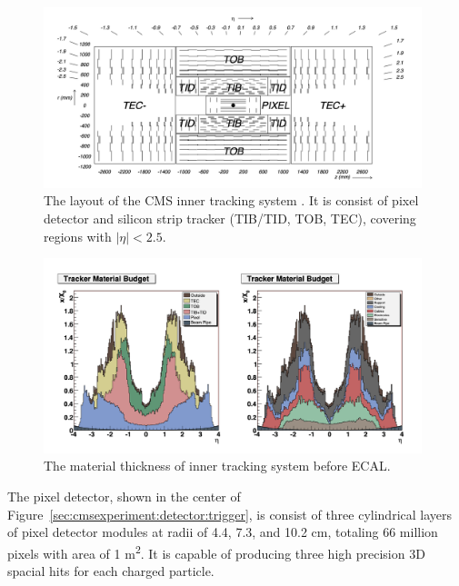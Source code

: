 \begin{figure}[ht]
    \centering
    \includegraphics[width=0.98\textwidth]{chapters/CMSExperiment/sectionDetector/figures/tracker.png}
    \caption{The layout of the CMS inner tracking system \cite{exhep:cms:Chatrchyan:2008aa}. It is consist of pixel detector and silicon strip tracker (TIB/TID, TOB, TEC), covering regions with $|\eta|<2.5$. }
    \label{sec:cmsexperiment:detector:tracker}
\end{figure}


\begin{figure}[ht]
    \centering
    \includegraphics[width=0.98\textwidth]{chapters/CMSExperiment/sectionDetector/figures/trackerMaterial.png}
    \caption{The material thickness of inner tracking system before ECAL.}
    \label{sec:cmsexperiment:detector:trackerMaterial}
\end{figure}


The pixel detector, shown in the center of Figure~\ref{sec:cmsexperiment:detector:trigger}, is consist of three cylindrical layers of pixel detector modules at radii of 4.4, 7.3, and 10.2 cm, totaling 66 million pixels with area of 1 \si{\m \squared}. It is capable of producing three high precision 3D spacial hits for each charged particle. 

